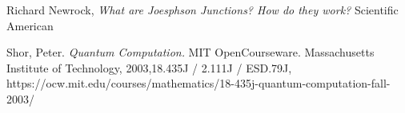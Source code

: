 \documentclass[a4paper]{article}
\begin{document}
\begin{thebibliography}{9}
	
	





	Richard Newrock,
	\emph{What are Joesphson Junctions? How do they work?}
	Scientific American
	

	Shor, Peter. \emph{Quantum Computation.} MIT OpenCourseware. Massachusetts Institute of Technology, 2003,18.435J / 2.111J / ESD.79J, \newline https://ocw.mit.edu/courses/mathematics/18-435j-quantum-computation-fall-2003/






	
	
  


\end{thebibliography}
\end{document}
